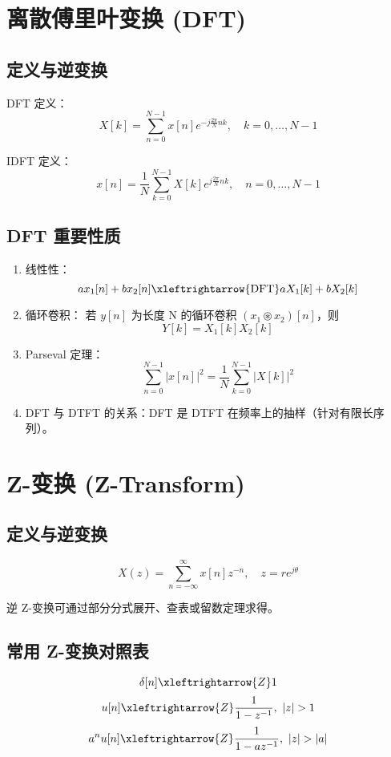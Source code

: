 \documentclass[12pt,a4paper]{article}
\begin{document}
\begin{CJK}{UTF8}{gbsn}
\section{离散傅里叶变换 (DFT)}

\subsection{定义与逆变换}
DFT 定义：
\[
X[k] = \sum_{n=0}^{N-1} x[n] e^{-j\frac{2\pi}{N}nk}, \quad k=0,\ldots,N-1
\]

IDFT 定义：
\[
x[n] = \frac{1}{N}\sum_{k=0}^{N-1} X[k] e^{j\frac{2\pi}{N}nk}, \quad n=0,\ldots,N-1
\]

\subsection{DFT 重要性质}
\begin{enumerate}
\item 线性性：
\[
a x_1[n] + b x_2[n] \xleftrightarrow{\text{DFT}} a X_1[k] + b X_2[k]
\]

\item 循环卷积：
若 \(y[n]\) 为长度 N 的循环卷积 \((x_1 \circledast x_2)[n]\)，则
\[
Y[k] = X_1[k] X_2[k]
\]

\item Parseval 定理：
\[
\sum_{n=0}^{N-1} |x[n]|^2 = \frac{1}{N}\sum_{k=0}^{N-1} |X[k]|^2
\]

\item DFT 与 DTFT 的关系：DFT 是 DTFT 在频率上的抽样（针对有限长序列）。
\end{enumerate}

\section{Z-变换 (Z-Transform)}

\subsection{定义与逆变换}
\[
X(z) = \sum_{n=-\infty}^{\infty} x[n] z^{-n}, \quad z=re^{j\theta}
\]

逆 Z-变换可通过部分分式展开、查表或留数定理求得。

\subsection{常用 Z-变换对照表}
\[
\delta[n] \xleftrightarrow{Z} 1
\]
\[
u[n] \xleftrightarrow{Z} \frac{1}{1-z^{-1}},\ |z|>1
\]
\[
a^n u[n] \xleftrightarrow{Z} \frac{1}{1 - a z^{-1}},\ |z|>|a|
\]


\end{CJK}
\end{document}
